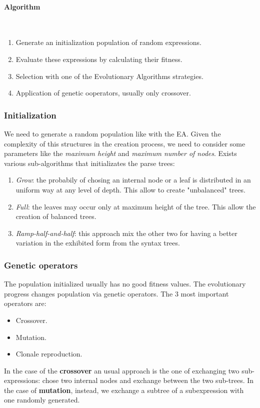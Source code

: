 \documentclass{article}
\begin{document}
\paragraph{Algorithm}\mbox{}\\
\begin{enumerate}
    \item Generate an initialization population of random expressions.
    \item Evaluate these expressions by calculating their fitness.
    \item Selection with one of the Evolutionary Algorithms strategies.
    \item Application of genetic ooperators, usually only crossover.
\end{enumerate}

\subsubsection{Initialization}
We need to generate a random population like with the EA. Given the complexity of this structures
in the creation process, we need to consider some parameters like the \textit{maximum height}
and \textit{maximum number of nodes}. Exists various sub-algorithms that initializates
the parse trees:
\begin{enumerate}
    \item \textit{Grow}: the probabily of chosing an internal node or a leaf is distributed
          in an uniform way at any level of depth. This allow to create "unbalanced" trees.

    \item \textit{Full}: the leaves may occur only at maximum height of the tree. This allow
          the creation of balanced trees.

    \item \textit{Ramp-half-and-half}: this approach mix the other two for having a better
          variation in the exhibited form from the syntax trees.
\end{enumerate}

\subsubsection{Genetic operators}
The population initialized usually has no good fitness values. The evolutionary progress
changes population via genetic operators. The 3 most important operators are:
\begin{itemize}
    \item Crossover.
    \item Mutation.
    \item Clonale reproduction.
\end{itemize}
In the case of the \textbf{crossover} an usual approach is the one of exchanging two sub-expressions:
chose two internal nodes and exchange between the two sub-trees.
In the case of \textbf{mutation}, instead, we exchange a subtree of a subexpression
with one randomly generated.
\end{document}
